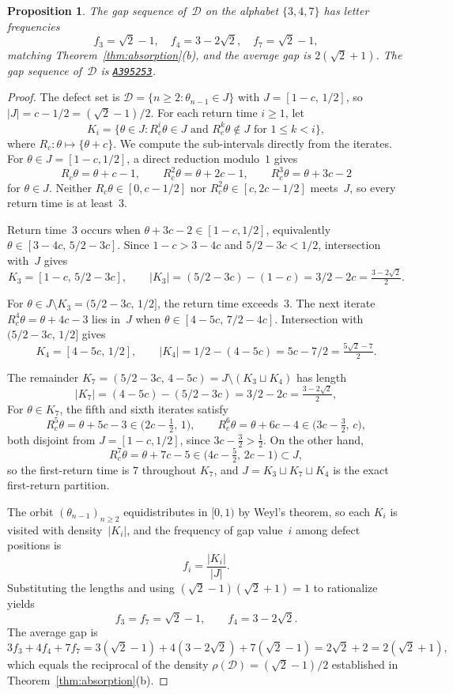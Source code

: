 \documentclass[10pt,a4paper]{amsart}
\newtheorem{proposition}{Proposition}
\newcommand{\frc}[1]{\{ #1 \}}
\begin{document}
\begin{proposition}\label{prop:defect_substitution}
The gap sequence of~$\mathcal{D}$ on the alphabet
$\{3,4,7\}$ has letter frequencies
\[
  f_{3}=\sqrt{2}-1,\quad f_{4}=3-2\sqrt{2},\quad f_{7}=\sqrt{2}-1,
\]
matching Theorem~\ref{thm:absorption}(b), and the
average gap is $2(\sqrt{2}+1)$. The gap sequence
of~$\mathcal{D}$ is
\href{https://oeis.org/A395253}{\texttt{A395253}}.
\end{proposition}

\begin{proof}
The defect set is
$\mathcal{D}=\{n\ge 2:\theta_{n-1}\in J\}$ with
$J=[1-c,\,1/2]$, so $|J|=c-1/2=(\sqrt{2}-1)/2$.
For each return time $i\ge 1$, let
\[
  K_{i}=\{\theta\in J: R_{c}^{i}\theta\in J
  \text{ and } R_{c}^{k}\theta\notin J
  \text{ for }1\le k<i\},
\]
where $R_{c}\colon\theta\mapsto\frc{\theta+c}$.
We compute the sub-intervals directly from the
iterates. For $\theta\in J=[1-c,1/2]$, a direct reduction
modulo~$1$ gives
\[
  R_{c}\theta=\theta+c-1,\qquad
  R_{c}^{2}\theta=\theta+2c-1,\qquad
  R_{c}^{3}\theta=\theta+3c-2
\]
for $\theta\in J$. Neither $R_{c}\theta\in[0,c-1/2]$
nor $R_{c}^{2}\theta\in[c,2c-1/2]$ meets~$J$, so
every return time is at least~$3$.

Return time~$3$ occurs when
$\theta+3c-2\in[1-c,1/2]$, equivalently
$\theta\in[3-4c,\,5/2-3c]$. Since $1-c>3-4c$
and $5/2-3c<1/2$, intersection with~$J$ gives
\[
  K_{3}=[1-c,\,5/2-3c],\qquad
  |K_{3}|=(5/2-3c)-(1-c)=3/2-2c=\tfrac{3-2\sqrt{2}}{2}.
\]

For $\theta\in J\setminus K_{3}=(5/2-3c,\,1/2]$, the
return time exceeds~$3$. The next iterate
$R_{c}^{4}\theta=\theta+4c-3$ lies in~$J$ when
$\theta\in[4-5c,\,7/2-4c]$. Intersection with
$(5/2-3c,\,1/2]$ gives
\[
  K_{4}=[4-5c,\,1/2],\qquad
  |K_{4}|=1/2-(4-5c)=5c-7/2=\tfrac{5\sqrt{2}-7}{2}.
\]

The remainder
$K_{7}=(5/2-3c,\,4-5c)=J\setminus(K_{3}\sqcup K_{4})$
has length
\[
  |K_{7}|=(4-5c)-(5/2-3c)=3/2-2c=\tfrac{3-2\sqrt{2}}{2},
\]
For $\theta\in K_{7}$, the fifth and sixth iterates satisfy
\[
  R_{c}^{5}\theta=\theta+5c-3\in\bigl(2c-\tfrac12,\,1\bigr),
  \qquad
  R_{c}^{6}\theta=\theta+6c-4\in\bigl(3c-\tfrac32,\,c\bigr),
\]
both disjoint from $J=[1-c,1/2]$, since $3c-\tfrac32>\tfrac12$.
On the other hand,
\[
  R_{c}^{7}\theta=\theta+7c-5\in\bigl(4c-\tfrac52,\,2c-1\bigr)
  \subset J,
\]
so the first-return time is $7$ throughout $K_{7}$, and
$J=K_{3}\sqcup K_{7}\sqcup K_{4}$ is the exact first-return
partition.

The orbit $(\theta_{n-1})_{n\ge 2}$ equidistributes
in $[0,1)$ by Weyl's theorem, so each $K_{i}$ is
visited with density~$|K_{i}|$, and the frequency
of gap value~$i$ among defect positions is
\[
  f_{i}=\frac{|K_{i}|}{|J|}.
\]
Substituting the lengths and using
$(\sqrt{2}-1)(\sqrt{2}+1)=1$ to rationalize yields
\[
  f_{3}=f_{7}=\sqrt{2}-1,\qquad
  f_{4}=3-2\sqrt{2}.
\]
The average gap is
\[
  3f_{3}+4f_{4}+7f_{7}
  =3(\sqrt{2}{-}1)+4(3{-}2\sqrt{2})+7(\sqrt{2}{-}1)
  =2\sqrt{2}+2
  =2(\sqrt{2}{+}1),
\]
which equals the reciprocal of the density
$\rho(\mathcal{D})=(\sqrt{2}-1)/2$ established in
Theorem~\ref{thm:absorption}(b).
\end{proof}
\end{document}

